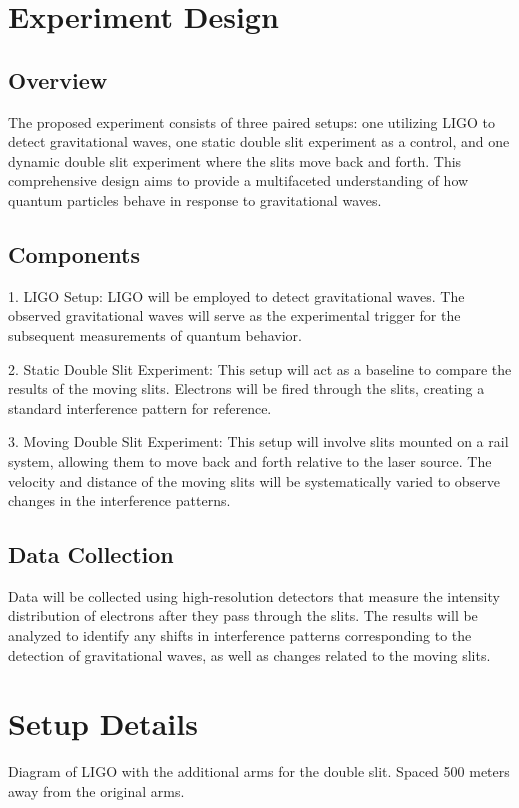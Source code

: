 \documentclass{article}
\begin{document}
\section{Experiment Design}

\subsection{Overview}
The proposed experiment consists of three paired setups: one utilizing LIGO to detect gravitational waves, one static double slit experiment as a control, and one dynamic double slit experiment where the slits move back and forth. This comprehensive design aims to provide a multifaceted understanding of how quantum particles behave in response to gravitational waves.

\subsection{Components}
1. LIGO Setup: LIGO will be employed to detect gravitational waves. The observed gravitational waves will serve as the experimental trigger for the subsequent measurements of quantum behavior.

2. Static Double Slit Experiment: This setup will act as a baseline to compare the results of the moving slits. Electrons will be fired through the slits, creating a standard interference pattern for reference.

3. Moving Double Slit Experiment: This setup will involve slits mounted on a rail system, allowing them to move back and forth relative to the laser source. The velocity and distance of the moving slits will be systematically varied to observe changes in the interference patterns.

\subsection{Data Collection}
Data will be collected using high-resolution detectors that measure the intensity distribution of electrons after they pass through the slits. The results will be analyzed to identify any shifts in interference patterns corresponding to the detection of gravitational waves, as well as changes related to the moving slits.

\section{Setup Details}
Diagram of LIGO with the additional arms for the double slit. Spaced 500 meters away from the original arms.
\end{document}
